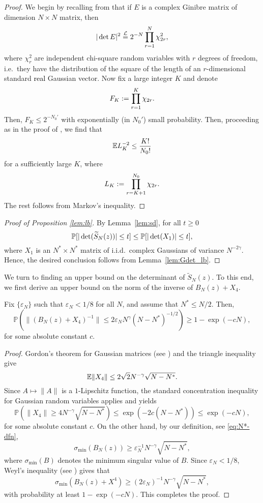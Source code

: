 \documentclass{amsart}
\numberwithin{equation}{section}
\def\corAB{}
\def\corOZ{}
\def\corABrev{\textcolor{black}}
\begin{document}
\begin{proof}
  \corOZ{We begin by recalling from \cite{G} that if $E$ is a complex Ginibre matrix}
  \corAB{of dimension $N \times N$ matrix, then
\[
|\det E|^2 \lawequals \corABrev{2^{-N} \prod_{r=1}^N \chi_{2r}^2},
\]
where $\chi_r^2$ are independent}
\corOZ{chi-square random variables with $r$ degrees of freedom, i.e.\ they
have} \corAB{the distribution of the square of the
length of an $r$-dimensional standard \corABrev{real} Gaussian vector.} Now fix a large integer $K$ and denote
\[
F_K:= \prod_{r=1}^K \corABrev{\chi_{2r}}.
\]
Then, $F_K \le 2^{-N_0'}$ with exponentially (in $N_0'$)
small probability. Then,
proceeding as in the proof of \cite[Lemma 2.5]{FPZ}, we find
that
\[
\corABrev{\E L_K^{-2} \le \frac{K!}{N_0!}}
\]
for a sufficiently large $K$, where
\[
L_K:=\prod_{r=K+1}^{N_0} \corABrev{\chi_{2r}}.
\]
The rest follows from Markov's inequality.
\end{proof}
\begin{proof}[Proof of Proposition \ref{lem:lb}]
 By Lemma~\ref{lem:sd}, for all $t \geq 0$
 \[
   \P[|\det(\widetilde{S}_N(z))| \leq t] \leq \P[|\det(X_1)| \leq t],
 \]
 where $X_1$
 is an $N^* \times N^*$ matrix of \corAB{i.i.d.~complex
 Gaussians of variance $N^{-2\gamma}$}.  Hence, the desired conclusion follows from Lemma~\ref{lem:Gdet_lb}.
 \end{proof}
We turn to finding an upper bound on the determinant of
$\widetilde{S}_N(z)$. To this end, we first derive an
upper bound on the norm of the inverse of $B_N(z) + X_4$.
\begin{lemma} \label{lem:opbound}
Fix $\{\varepsilon_N\}$
such that $\varepsilon_N <1/8$ for all $N$, and
assume that
$N^* \le N/2$. Then,
  \[
\mathbb{P}\left(    \| (B_N(z) + X_4)^{-1} \| \leq 2\varepsilon_N N^{\gamma} (N-N^*)^{-1/2}\right) \ge 1 -\exp(-cN),
  \]
for some absolute constant $c$.
\end{lemma}
\begin{proof}
Gordon's theorem for Gaussian matrices (see \cite[Corollary 1.2]{gordon})
and the triangle inequality give
\[
\E\|X_4\| \le 2\sqrt{2}N^{-\gamma}\sqrt{N-N^*}.
\]
Since $A \mapsto \|A\|$ is a $1$-Lipschitz function,
the standard concentration inequality for Gaussian
random variables applies and yields
\[
\mathbb{P}\left(\|X_4\| \ge 4 N^{-\gamma}\sqrt{N-N^*}\right) \le \exp(-2c(N-N^*)) \le \exp(-cN),
\]
for some absolute constant $c$. On the other hand, by our definition,
see \eqref{eq:N*-dfn},
\[
\sigma_{\min}(B_N(z)) \ge \varepsilon_N^{-1} N^{-\gamma} \sqrt{N-N^*},
\]
where $\sigma_{\min}(B)$ denotes the minimum singular value of $B$. Since $\varepsilon_N < 1/8$, Weyl's inequality
(see \cite[Theorem 3.3.16(c)]{horn37topics}) gives that
\[
\sigma_{\min}(B_N(z)+X^4) \ge (2\varepsilon_N)^{-1} N^{-\gamma} \sqrt{N-N^*},
\]
with probability at least $1-\exp(-cN)$. This completes the proof.
\end{proof}
\end{document}
